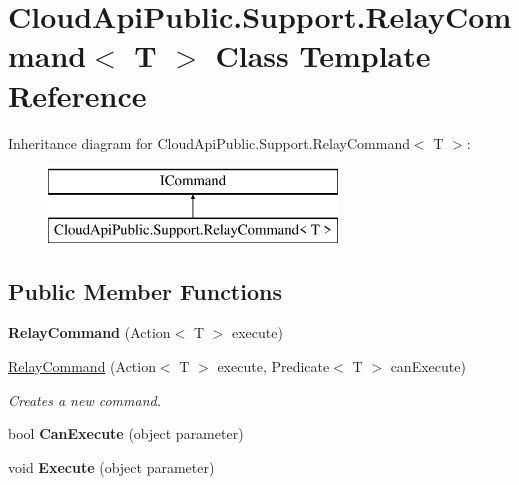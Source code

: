\hypertarget{class_cloud_api_public_1_1_support_1_1_relay_command_3_01_t_01_4}{\section{Cloud\-Api\-Public.\-Support.\-Relay\-Command$<$ T $>$ Class Template Reference}
\label{class_cloud_api_public_1_1_support_1_1_relay_command_3_01_t_01_4}
}
Inheritance diagram for Cloud\-Api\-Public.\-Support.\-Relay\-Command$<$ T $>$\-:\begin{figure}[H]
\begin{center}
\leavevmode
\includegraphics[height=2.000000cm]{class_cloud_api_public_1_1_support_1_1_relay_command_3_01_t_01_4}
\end{center}
\end{figure}
\subsection*{Public Member Functions}
\begin{DoxyCompactItemize}
\item 
\hypertarget{class_cloud_api_public_1_1_support_1_1_relay_command_3_01_t_01_4_a9ef53f2f2fb0cd8a2e47a037869f1102}{{\bfseries Relay\-Command} (Action$<$ T $>$ execute)}\label{class_cloud_api_public_1_1_support_1_1_relay_command_3_01_t_01_4_a9ef53f2f2fb0cd8a2e47a037869f1102}

\item 
\hyperlink{class_cloud_api_public_1_1_support_1_1_relay_command_3_01_t_01_4_a0ba75b7a8dbc955442a29373f9ec2318}{Relay\-Command} (Action$<$ T $>$ execute, Predicate$<$ T $>$ can\-Execute)
\begin{DoxyCompactList}\small\item\em Creates a new command. \end{DoxyCompactList}\item 
\hypertarget{class_cloud_api_public_1_1_support_1_1_relay_command_3_01_t_01_4_ad901bf556a22fc4fc0daee43db1ba03d}{bool {\bfseries Can\-Execute} (object parameter)}\label{class_cloud_api_public_1_1_support_1_1_relay_command_3_01_t_01_4_ad901bf556a22fc4fc0daee43db1ba03d}

\item 
\hypertarget{class_cloud_api_public_1_1_support_1_1_relay_command_3_01_t_01_4_ad37e4cd93fb1beeaf07c90308dd24c2e}{void {\bfseries Execute} (object parameter)}\label{class_cloud_api_public_1_1_support_1_1_relay_command_3_01_t_01_4_ad37e4cd93fb1beeaf07c90308dd24c2e}

\end{DoxyCompactItemize}
